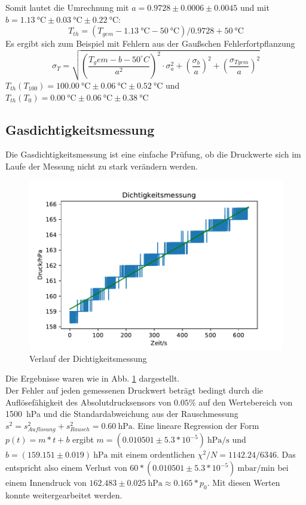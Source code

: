 \documentclass[]{article}
\begin{document}
	Somit lautet die Umrechnung
	mit $a = 0.9728 \pm 0.0006 \pm 0.0045$
	und mit $b = \SI{1.13}{\celsius} \pm \SI{0.03}{\celsius} \pm \SI{0.22}{\celsius}$:
	\begin{equation}
	T_{th} = (T_{gem}-\SI{1.13}{\celsius}-\SI{50}{\celsius})/0.9728 + \SI{50}{\celsius}
	\label{Kalibrierung}
	\end{equation}
	Es ergibt sich zum Beispiel mit Fehlern aus der Gaußschen Fehlerfortpflanzung 	
	\begin{equation}
	\sigma_T = \sqrt{\left(\frac{T_gem-b-50 ^{\circ}C}{a^2}\right)^2 \cdot \sigma_a^2 +\left(\frac{\sigma_b}{a}\right)^2 + \left(\frac{\sigma_{Tgem}}{a}\right)^2}
	\end{equation}
	$T_{th}(T_{100}) = \SI{100.00}{\celsius} \pm  \SI{0.06}{\celsius} \pm \SI{0.52}{\celsius}$
	und $T_{th}(T_0) = \SI{0.00}{\celsius} \pm \SI{0.06}{\celsius} \pm \SI{0.38}{\celsius}$
	\\
	\subsection{Gasdichtigkeitsmessung}
	Die Gasdichtigkeitsmessung ist eine einfache Prüfung, ob die Druckwerte sich im Laufe der Messung nicht zu stark verändern werden.
	\begin{figure}
		\begin{center}
			\includegraphics[scale=0.9]{Images/Kalib_Dichtigkeitsmessung.pdf}
			\caption{Verlauf der Dichtigkeitsmessung}
			\label{GD_data}
		\end{center}
	\end{figure}
	Die Ergebnisse waren wie in Abb. \ref{GD_data} dargestellt. \\
	Der Fehler auf jeden gemessenen Druckwert beträgt bedingt durch die Auflösefähigkeit des Absolutdrucksensors von $0.05\%$ auf den Wertebereich von \SI{1500}{\hecto \pascal} und die
	Standardabweichung aus der Rauschmessung $s^{2} = s^{2}_{Aufl\ddot{o}sung}+s^{2}_{Rausch} = \SI{0.60}{\hecto \pascal}$. 
	Eine lineare Regression der Form $p(t)=m*t+b$ ergibt $m = (0.010501 \pm 5.3*10^{-5})\SI{}{\hecto \pascal/ \second}$ und $b = (159.151 \pm 0.019)\SI{}{\hecto \pascal}$ mit einem ordentlichen $\chi ^{2}/N=1142.24 / 6346$. Das entspricht also einem Verlust von $60*(0.010501 \pm 5.3*10^{-5})\SI{}{\milli \bar / \minute}$ bei einem Innendruck von $162.483 \pm 0.025 \SI{}{\hecto \pascal} \approx 0.165*p_0$. Mit diesen Werten konnte weitergearbeitet werden.
\end{document}
